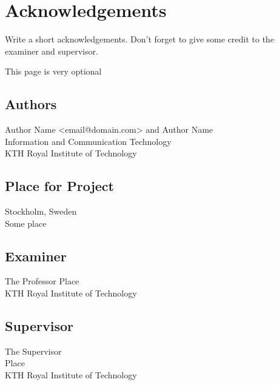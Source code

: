 \newpage
\section*{Acknowledgements}
Write a short acknowledgements. Don't forget to give some credit to the examiner and supervisor.






\newpage
\thispagestyle{empty}
This page is very optional

\vfill
{ 
	\subsection*{Authors}
	Author Name <email@domain.com> and Author Name\\
	Information and Communication Technology\\
	KTH Royal Institute of Technology
	
	\subsection*{Place for Project}
	Stockholm, Sweden\\
	Some place
	
	\subsection*{Examiner}
	The Professor
	Place \\
	KTH Royal Institute of Technology
	
	\subsection*{Supervisor }
	The Supervisor\\
	Place\\
	KTH Royal Institute of Technology
	~
	
}


